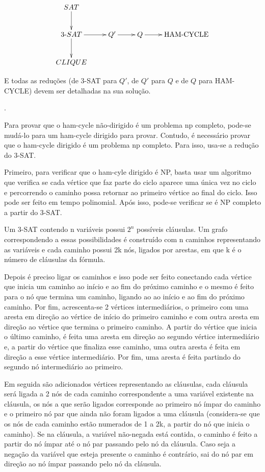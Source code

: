 \documentclass[12pt]{article}
\newcommand{\resposta}[1]{ \noindent {\bf Solução}.{\color{blue} #1}}
\begin{document}
\begin{enumerate}
$$\xymatrix{
  SAT \ar[d] & & & \\
  3\mbox{-}SAT \ar[d]\ar[r] & Q' \ar[r] & Q \ar[r] & \mbox{HAM-CYCLE}  \\
  CLIQUE & & & 
}$$

E todas as reduções (de 3-SAT para $Q'$, de $Q'$ para $Q$ e de $Q$ para HAM-CYCLE) devem ser detalhadas na sua solução.

\resposta{
    Para provar que o ham-cycle não-dirigido é um problema np completo, pode-se mudá-lo para um ham-cycle dirigido para provar. Contudo, é necessário provar que o ham-cycle dirigido é um problema np completo. Para isso, usa-se a redução do 3-SAT.

Primeiro, para verificar que o ham-cyle dirigido é NP, basta usar um algoritmo que verifica se cada vértice que faz parte do ciclo aparece uma única vez no ciclo e percorrendo o caminho possa retornar ao primeiro vértice ao final do ciclo. Isso pode ser feito em tempo polinomial. Após isso, pode-se verificar se é NP completo a partir do 3-SAT.

Um 3-SAT contendo n variáveis possui ${2^n}$ possíveis cláusulas. Um grafo correspondendo a essas possibilidades é construído com n caminhos representando as variáveis e cada caminho possui 2k nós, ligados por arestas, em que k é o número de cláusulas da fórmula.

Depois é preciso ligar os caminhos e isso pode ser feito conectando cada vértice que inicia um caminho ao início e ao fim do próximo caminho e o mesmo é feito para o nó que termina um caminho, ligando ao ao início e ao fim do próximo caminho. Por fim, acrescenta-se 2 vértices intermediários, o primeiro com uma aresta em direção ao vértice de início do primeiro caminho e com outra aresta em direção ao vértice que termina o primeiro caminho. A partir do vértice que inicia o último caminho, é feita uma aresta em direção ao segundo vértice intermediário e, a partir do vértice que finaliza esse caminho, uma outra aresta é feita em direção a esse vértice intermediário. Por fim, uma aresta é feita partindo do segundo nó intermediário ao primeiro.

Em seguida são adicionados vértices representando as cláusulas, cada cláusula será ligada a 2 nós de cada caminho correspondente a uma variável existente na cláusula, os nós a que serão ligados corresponde ao primeiro nó ímpar do caminho e o primeiro nó par que ainda não foram ligados a uma cláusula (considera-se que os nós de cada caminho estão numerados de 1 a 2k, a partir do nó que inicia o caminho). Se na cláusula, a variável não-negada está contida, o caminho é feito a partir do nó ímpar até o nó par passando pelo nó da cláusula. Caso seja a negação da variável que esteja presente o caminho é contrário, sai do nó par em direção ao nó ímpar passando pelo nó da cláusula.

}
\end{enumerate}
\end{document}
